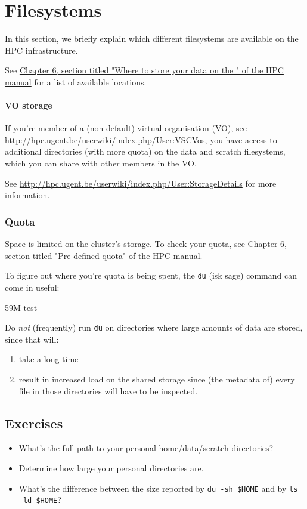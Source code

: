 \chapter{Filesystems}

In this section, we briefly explain which different filesystems are available on
the HPC infrastructure.

See \href{\HPCManualURL#predefined-user-directories}{Chapter 6, section titled "Where to store your data on the \hpc{}" of the HPC manual}
for a list of available locations.

\subsubsection{VO storage}

If you're member of a (non-default) virtual organisation (VO), see
\url{http://hpc.ugent.be/userwiki/index.php/User:VSCVos}, you have access to
additional directories (with more quota) on the data and scratch filesystems,
which you can share with other members in the VO.

See \url{http://hpc.ugent.be/userwiki/index.php/User:StorageDetails} for more
information.

\subsection{Quota}

Space is limited on the cluster's storage. To check your quota, see
\href{\HPCManualURL#predefined-quotas}{Chapter 6, section titled "Pre-defined quota" of the HPC manual}.

To figure out where you're quota is being spent, the \verb|du| (isk sage)
command can come in useful:

\begin{prompt}
59M   test
\end{prompt}

Do \emph{not} (frequently) run \verb|du| on directories where large amounts
of data are stored, since that will:
\begin{enumerate}
    \item take a long time
    \item result in increased
        load on the shared storage since (the metadata of) every file in those directories
        will have to be inspected.
\end{enumerate}

\section{Exercises}

\begin{itemize}
    \item What's the full path to your personal home/data/scratch directories?
    \item Determine how large your personal directories are.
    \item What's the difference between the size reported by \verb|du -sh $HOME|
        and by \verb|ls -ld $HOME|?
\end{itemize}
